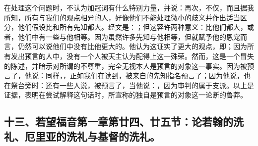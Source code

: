 在处理这个问题时，不认为加冠词有什么特别力量，并说：再次，不仅，而且据我所知，所有与我们的观点相异的人，好像他们不能处理微小的歧义并作出适当区分，他们假设比和所有先知都大。经文是：；但这容许两种意义：比他们都大，或者，他们中有一些与他相等。因为虽然许多先知与他相等，但就赋予他的恩宠而言，仍然可以说他们中没有比他更大的。他认为这证实了更大的观点，即；因为所有发出预言的人中，没有一个人被天主认为配得上这一殊荣。然而，这是一个冒失的陈述，并暗示对所谓的不尊重，完全无视本人是预言的对象这一事实。因为被预言了，他说：同样，，正如我们在读到，被来自的先知指名预言了；因为他说，也在祭台旁时：还有一些人说，被预言了，当他说：，因为审判的属于支派。以上是证据，表明在尝试解释这句话时，所宣称的独自是预言的对象这一论断的鲁莽。\par


\subsection{十三、若望福音第一章第廿四、廿五节：论若翰的洗礼、厄里亚的洗礼与基督的洗礼。}

